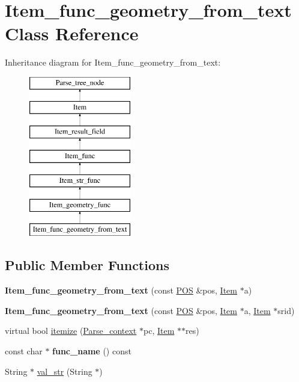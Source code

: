 \hypertarget{classItem__func__geometry__from__text}{}\section{Item\+\_\+func\+\_\+geometry\+\_\+from\+\_\+text Class Reference}
\label{classItem__func__geometry__from__text}
Inheritance diagram for Item\+\_\+func\+\_\+geometry\+\_\+from\+\_\+text\+:\begin{figure}[H]
\begin{center}
\leavevmode
\includegraphics[height=7.000000cm]{classItem__func__geometry__from__text}
\end{center}
\end{figure}
\subsection*{Public Member Functions}
\begin{DoxyCompactItemize}
\item 
\mbox{\label{classItem__func__geometry__from__text_aef06159766e8f02977f299fe431dfd6a}} 
{\bfseries Item\+\_\+func\+\_\+geometry\+\_\+from\+\_\+text} (const \mbox{\hyperlink{structYYLTYPE}{P\+OS}} \&pos, \mbox{\hyperlink{classItem}{Item}} $\ast$a)
\item 
\mbox{\label{classItem__func__geometry__from__text_a0d816724345330bed18b78a4d6e552e5}} 
{\bfseries Item\+\_\+func\+\_\+geometry\+\_\+from\+\_\+text} (const \mbox{\hyperlink{structYYLTYPE}{P\+OS}} \&pos, \mbox{\hyperlink{classItem}{Item}} $\ast$a, \mbox{\hyperlink{classItem}{Item}} $\ast$srid)
\item 
virtual bool \mbox{\hyperlink{classItem__func__geometry__from__text_a728cf06ce841c738abdd5887b4ecb643}{itemize}} (\mbox{\hyperlink{structParse__context}{Parse\+\_\+context}} $\ast$pc, \mbox{\hyperlink{classItem}{Item}} $\ast$$\ast$res)
\item 
\mbox{\label{classItem__func__geometry__from__text_ab5a99c373ebf52ba52fa000dbc847d6b}} 
const char $\ast$ {\bfseries func\+\_\+name} () const
\item 
String $\ast$ \mbox{\hyperlink{classItem__func__geometry__from__text_ae1cb35368411da4e3a20181f51b0c818}{val\+\_\+str}} (String $\ast$)
\end{DoxyCompactItemize}
